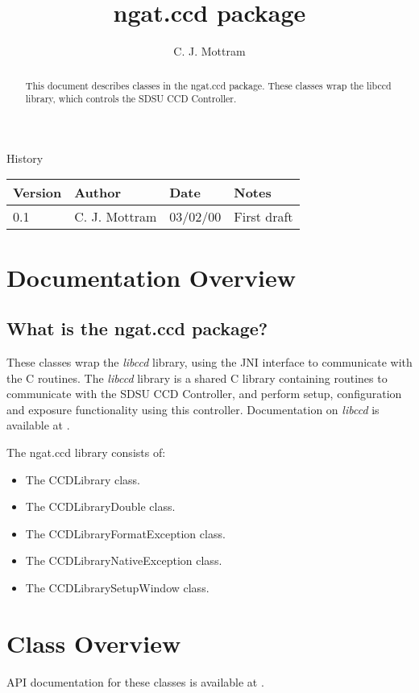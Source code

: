 \documentclass[10pt,a4paper]{article}
\title{ngat.ccd package}
\author{C. J. Mottram}
\date{}
\begin{document}
\thispagestyle{empty}
\maketitle
\begin{abstract}
This document describes classes in the ngat.ccd package.
These classes wrap the libccd library, which controls the SDSU CCD Controller.
\end{abstract}

\centerline{\Large History}
\begin{center}
\begin{tabular}{|l|l|l|p{15em}|}
\hline
{\bf Version} & {\bf Author} & {\bf Date} & {\bf Notes} \\
\hline
0.1 &              C. J. Mottram & 03/02/00 & First draft \\
\hline
\end{tabular}
\end{center}

\newpage
\tableofcontents
\listoffigures
\listoftables
\newpage

\section{Documentation Overview}
\subsection{What is the ngat.ccd package?}
These classes wrap the {\em libccd} library, using the JNI interface to communicate with the C routines.
The {\em libccd} library is a shared C library containing routines to communicate with the SDSU CCD Controller,
and perform setup, configuration and exposure functionality using this controller.
Documentation on {\em libccd} is available at \cite{bib:libccd}.

The ngat.ccd library consists of:
\begin{itemize}
\item The CCDLibrary class.
\item The CCDLibraryDouble class.
\item The CCDLibraryFormatException class.
\item The CCDLibraryNativeException class.
\item The CCDLibrarySetupWindow class.
\end{itemize}

\section{Class Overview}
API documentation for these classes is available at \cite{bib:ngatccdapi}.
\end{document}

